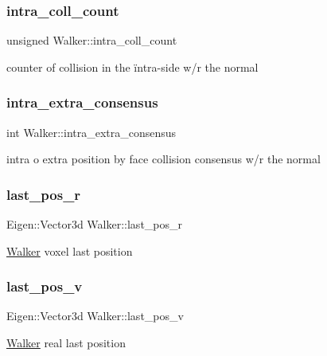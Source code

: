 \subsubsection{\texorpdfstring{intra\+\_\+coll\+\_\+count}{intra\_coll\_count}}
{\footnotesize\ttfamily unsigned Walker\+::intra\+\_\+coll\+\_\+count}

counter of collision in the ïntra-\/side w/r the normal \mbox{\label{class_walker_aa211ac1f9a396b1bf3b565e0f8ed098a}} 
\subsubsection{\texorpdfstring{intra\+\_\+extra\+\_\+consensus}{intra\_extra\_consensus}}
{\footnotesize\ttfamily int Walker\+::intra\+\_\+extra\+\_\+consensus}

intra o extra position by face collision consensus w/r the normal \mbox{\label{class_walker_a8c78216899e04e9439a991cbad9df36f}} 
\subsubsection{\texorpdfstring{last\+\_\+pos\+\_\+r}{last\_pos\_r}}
{\footnotesize\ttfamily Eigen\+::\+Vector3d Walker\+::last\+\_\+pos\+\_\+r}

\hyperlink{class_walker}{Walker} voxel last position \mbox{\label{class_walker_a2d50601346a754183b38890c18e7a6e7}} 
\subsubsection{\texorpdfstring{last\+\_\+pos\+\_\+v}{last\_pos\_v}}
{\footnotesize\ttfamily Eigen\+::\+Vector3d Walker\+::last\+\_\+pos\+\_\+v}

\hyperlink{class_walker}{Walker} real last position \mbox{\label{class_walker_a77f5c801c38158bb8568f75a22baed20}} 

